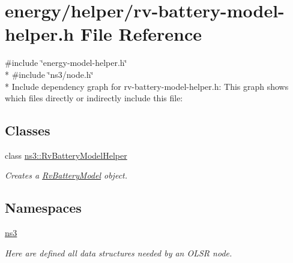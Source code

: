 \hypertarget{rv-battery-model-helper_8h}{}\section{energy/helper/rv-\/battery-\/model-\/helper.h File Reference}
\label{rv-battery-model-helper_8h}
{\ttfamily \#include \char`\"{}energy-\/model-\/helper.\+h\char`\"{}}\\*
{\ttfamily \#include \char`\"{}ns3/node.\+h\char`\"{}}\\*
Include dependency graph for rv-\/battery-\/model-\/helper.h\+:
This graph shows which files directly or indirectly include this file\+:
\subsection*{Classes}
\begin{DoxyCompactItemize}
\item 
class \hyperlink{classns3_1_1RvBatteryModelHelper}{ns3\+::\+Rv\+Battery\+Model\+Helper}
\begin{DoxyCompactList}\small\item\em Creates a \hyperlink{classns3_1_1RvBatteryModel}{Rv\+Battery\+Model} object. \end{DoxyCompactList}\end{DoxyCompactItemize}
\subsection*{Namespaces}
\begin{DoxyCompactItemize}
\item 
 \hyperlink{namespacens3}{ns3}
\begin{DoxyCompactList}\small\item\em Here are defined all data structures needed by an O\+L\+SR node. \end{DoxyCompactList}\end{DoxyCompactItemize}
